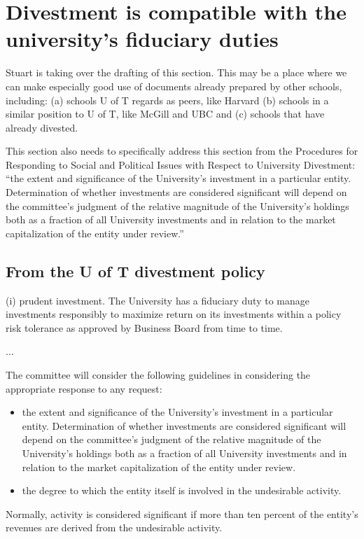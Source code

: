 


\section {Divestment is compatible with the university's fiduciary duties}

\begin{vcom}
  Stuart is taking over the drafting of this section. This may be a place where we can make especially good use of documents already prepared by other schools, including: (a) schools U of T regards as peers, like Harvard (b) schools in a similar position to U of T, like McGill and UBC and (c) schools that have already divested.
\end{vcom}

\begin{vcom}
  This section also needs to specifically address this section from the Procedures for Responding to Social and Political Issues with Respect to University Divestment: ``the extent and significance of the University’s investment in a particular entity.  Determination of whether investments are considered significant will depend on the committee's judgment of the relative magnitude of the University’s holdings both as a fraction of all University investments and in relation to the market capitalization of the entity under review.''
\end{vcom}

\subsection {From the U of T divestment policy}
(i) prudent investment. The University has a fiduciary duty to manage investments responsibly to maximize return on its investments within a policy risk tolerance as approved by Business Board from time to time.

...

The committee will consider the following guidelines in considering the appropriate response to any request:
\begin{itemize}
  \item the extent and significance of the University's investment in a particular entity. Determination of whether investments are considered significant will depend on the committee’s judgment of the relative magnitude of the University’s holdings both as a fraction of all University investments and in relation to the market capitalization of the entity under review.
  \item the degree to which the entity itself is involved in the undesirable activity.
\end{itemize}
Normally, activity is considered significant if more than ten percent of the entity's revenues are derived from the undesirable activity.

